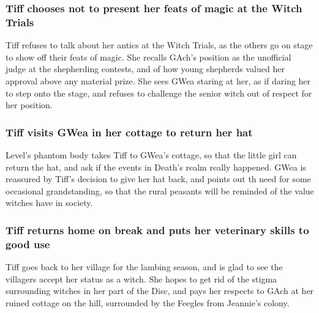 \subsubsection{\Gls{Tiff} chooses not to present her feats of magic at the Witch Trials}
\Gls{Tiff} refuses to talk about her antics at the Witch Trials, as the others go on stage to
show off their feats of magic. She recalls \Gls{GAch}'s position as the unofficial judge at the
shepherding contests, and of how young shepherds valued her approval above any material prize. She
sees \Gls{GWea} staring at her, as if daring her to step onto the stage, and refuses to challenge
the senior witch out of respect for her position.

\subsubsection{\Gls{Tiff} visits \Gls{GWea} in her cottage to return her hat}
\Gls{Level}'s phantom body takes \Gls{Tiff} to \Gls{GWea}'s cottage, so that the little girl can
return the hat, and ask if the events in \Gls{Death}'s realm really happened. \Gls{GWea} is
reassured by \Gls{Tiff}'s decision to give her hat back, and points out th need for some occasional
grandstanding, so that the rural peasants will be reminded of the value witches have in society.

\subsubsection{\Gls{Tiff} returns home on break and puts her veterinary skills to good use}
\Gls{Tiff} goes back to her village for the lambing season, and is glad to see the villagers accept
her status as a witch. She hopes to get rid of the stigma surrounding witches in her part of the
Disc, and pays her respects to \Gls{GAch} at her ruined cottage on the hill, surrounded by the
Feegles from \Gls{Jeannie}'s colony.